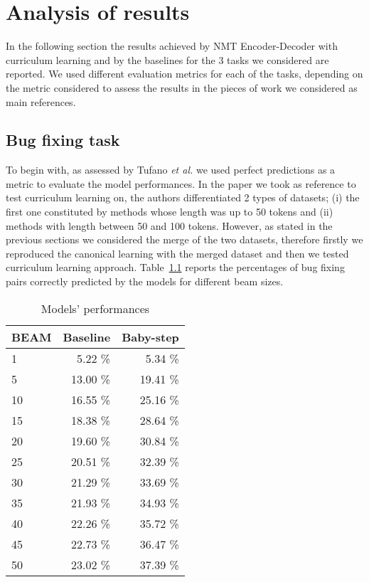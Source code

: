 \chapter{Analysis of results}
In the following section the results 
achieved by NMT Encoder-Decoder with curriculum learning and
by the baselines for the 3 tasks we considered are reported.
We used different evaluation metrics for each of the tasks, depending on the metric considered to 
assess the results in the pieces of work we considered as main references. 

\section{Bug fixing task}
To begin with, as assessed by Tufano \textit{et al.} \cite{Tufano2019} we used 
perfect predictions as a metric to evaluate the model performances. In the paper we took as reference
to test curriculum learning on, the authors differentiated 2 types of datasets; (i) the first one constituted by methods
whose length was up to 50 tokens and (ii) methods with length between 50 and 100 tokens. 
However, as stated in the previous sections
we considered the merge of the two datasets, 
therefore firstly we reproduced the canonical learning with the merged dataset and then we tested curriculum learning
approach.
Table~\ref{table:pp_bugfixing} reports the percentages %
of bug fixing pairs correctly predicted
by the models for different beam sizes.
\begin{table}[h!]
    \centering
    \begin{tabular}{l|r|r}
    BEAM & Baseline & Baby-step\\ [0.5ex]
    \hline 
    1 & 5.22 \% & 5.34 \%\\ 
    5 & 13.00 \% & 19.41 \%\\
    10 & 16.55 \% & 25.16 \%\\
    15 & 18.38 \% & 28.64 \%\\
    20 & 19.60 \% & 30.84 \%\\
    25 & 20.51 \% & 32.39 \%\\
    30 & 21.29 \% & 33.69 \%\\
    35 & 21.93 \% & 34.93 \%\\
    40 & 22.26 \% & 35.72 \%\\
    45 & 22.73 \% & 36.47 \%\\
    50 & 23.02 \% & 37.39 \%\\ [1ex]
    \end{tabular}
    \caption{Models' performances}
    \label{table:pp_bugfixing}
\end{table}
